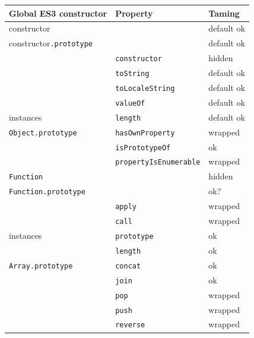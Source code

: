 \documentclass[letterpaper,twocolumn,10pt]{article}
\newcommand{\code}[1]{{\tt {#1}}}              %
\begin{document}
\begin{table}
\begin{tabular}{lll}
  Global ES3 constructor         & Property                    & Taming \\
  \hline 
  constructor                    &                             & default ok \\
  constructor\code{.prototype}   &                             & default ok \\
                                 & \code{constructor}          & hidden \\
                                 & \code{toString}             & default ok \\
                                 & \code{toLocaleString}       & default ok \\
                                 & \code{valueOf}              & default ok \\
  instances                      & \code{length}               & default ok \\
  \hline
  \code{Object.prototype}        & \code{hasOwnProperty}       & wrapped \\
                                 & \code{isPrototypeOf}        & ok \\
                                 & \code{propertyIsEnumerable} & wrapped \\
  \hline
  \code{Function}                &                             & hidden \\
  \code{Function.prototype}      &                             & ok? \\
                                 & \code{apply}                & wrapped \\
                                 & \code{call}                 & wrapped \\
  instances                      & \code{prototype}            & ok \\
                                 & \code{length}               & ok \\
  \hline
  \code{Array.prototype}         & \code{concat}               & ok \\
                                 & \code{join}                 & ok \\
                                 & \code{pop}                  & wrapped \\
                                 & \code{push}                 & wrapped \\
                                 & \code{reverse}              & wrapped \\

\end{tabular}
\end{table}
\end{document}
